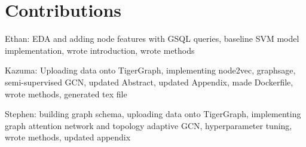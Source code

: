 \documentclass{article}
\begin{document}
\section{Contributions}
Ethan: EDA and adding node features with GSQL queries, baseline SVM model implementation, wrote introduction, wrote methods


Kazuma: Uploading data onto TigerGraph, implementing node2vec, graphsage, semi-supervised GCN, updated Abstract, updated Appendix, made Dockerfile, wrote methods, generated tex file


Stephen: building graph schema, uploading data onto TigerGraph, implementing graph attention network and topology adaptive GCN, hyperparameter tuning, wrote methods, updated appendix
\end{document}
